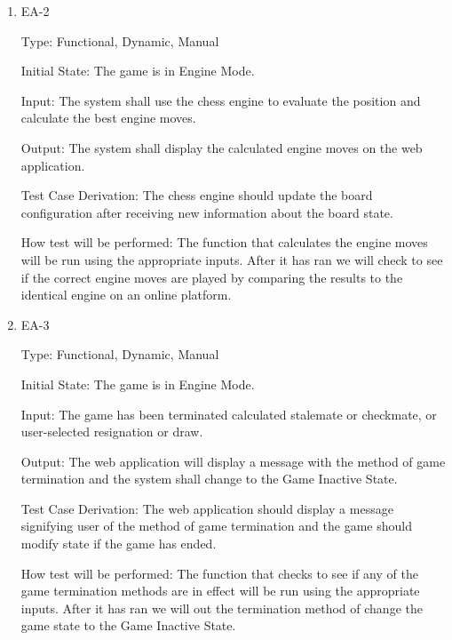 \documentclass[12pt, titlepage]{article}
\begin{document}
\begin{enumerate}
      \item{EA-2\\}
  
      Type: Functional, Dynamic, Manual
                        
      Initial State: The game is in Engine Mode.
                          
      Input: The system shall use the chess engine to evaluate the position and calculate the best
      engine moves.
                          
      Output: The system shall display the calculated engine moves on the web application.
                          
      Test Case Derivation: The chess engine should update the board configuration after receiving new information about the board state. 
  
      How test will be performed: The function that calculates the engine moves
      will be run using the appropriate inputs. After it has ran we will check to see if the correct engine moves are played
      by comparing the results to the identical engine on an online platform.
  
      \item{EA-3\\}
  
      Type: Functional, Dynamic, Manual
                        
      Initial State: The game is in Engine Mode.
                          
      Input: The game has been terminated calculated stalemate or checkmate, or user-selected resignation or draw.
                          
      Output: The web application will display a message with the method of game termination and the
      system shall change to the Game Inactive State.
                          
      Test Case Derivation: The web application should display a message signifying user of the method of game termination
      and the game should modify state if the game has ended.
  
      How test will be performed: The function that checks to see if any of the game termination methods are in effect
      will be run using the appropriate inputs. After it has ran we will out the termination method of change the
      game state to the Game Inactive State.
  
    \end{enumerate}
     
\end{document}
